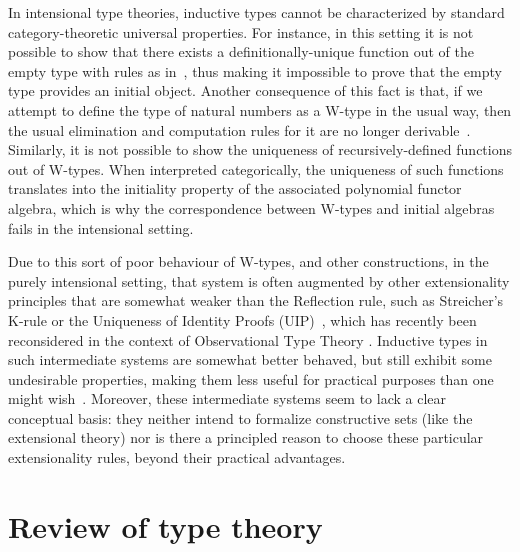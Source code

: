 \documentclass[10pt,a4paper,oneside,reqno]{amsart}
\numberwithin{equation}{section}
\theoremstyle{mythm}
\theoremstyle{mydef}
\theoremstyle{myrmk}
\begin{document}
In intensional type theories, inductive types cannot be characterized by standard category-theoretic
universal properties. For instance, in this setting it is not possible to show that there exists a 
definitionally-unique function out of the empty type with rules as in~\cite[Section~5.2]{NordstromB:marltt}, thus making it impossible to prove that the empty type provides an initial object. 
Another consequence of this fact is that, if we attempt to define the type of 
natural numbers as a W-type in the usual way, then 
the usual elimination and computation rules for it are no longer derivable~\cite{DybjerP:repids}. Similarly, it is not possible to show the uniqueness of recursively-defined functions out of W-types. When interpreted categorically, the uniqueness of such functions translates into the initiality property of the associated polynomial functor algebra, which is why the correspondence between W-types and initial algebras fails in the intensional setting.

Due to this sort of poor behaviour of W-types, and other constructions, in the purely intensional setting, that system is often augmented by other extensionality principles that are somewhat weaker than the Reflection rule, such as Streicher's K-rule  or the Uniqueness of Identity Proofs (UIP)~\cite{StreicherT:invitt}, which has recently been reconsidered
in the context of Observational Type Theory \cite{AltenkirchT:obsen}.  Inductive types in such intermediate systems are somewhat better behaved, but still exhibit some undesirable properties, making them less useful for practical purposes than one might wish~\cite{McBrideC:wtygnb}.  Moreover, these intermediate systems seem to lack a clear conceptual basis:  they neither intend to formalize constructive sets (like the extensional theory) nor is there a principled reason to choose these particular extensionality rules, beyond their practical advantages.  


\newpage

\section{Review of type theory}
\label{sec:bac}
\end{document}
